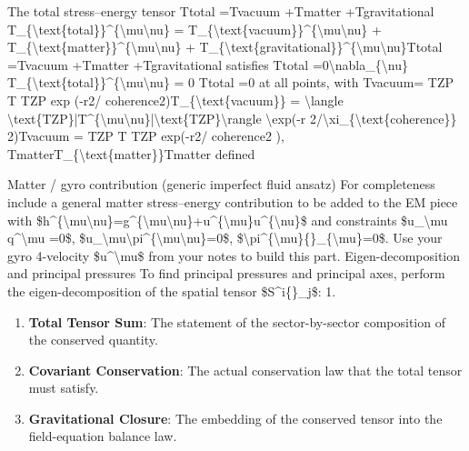The total stress--energy tensor Ttotal  =Tvacuum  +Tmatter  +Tgravitational  T\_\{\textbackslash{}text\{total\}\}\textasciicircum{}\{\textbackslash{}mu\textbackslash{}nu\} = T\_\{\textbackslash{}text\{vacuum\}\}\textasciicircum{}\{\textbackslash{}mu\textbackslash{}nu\} + T\_\{\textbackslash{}text\{matter\}\}\textasciicircum{}\{\textbackslash{}mu\textbackslash{}nu\} + T\_\{\textbackslash{}text\{gravitational\}\}\textasciicircum{}\{\textbackslash{}mu\textbackslash{}nu\}Ttotal   =Tvacuum   +Tmatter   +Tgravitational   satisfies   Ttotal  =0\textbackslash{}nabla\_\{\textbackslash{}nu\} T\_\{\textbackslash{}text\{total\}\}\textasciicircum{}\{\textbackslash{}mu\textbackslash{}nu\} = 0   Ttotal   =0 at all points, with Tvacuum= TZP T   TZP exp (-r2/ coherence2)T\_\{\textbackslash{}text\{vacuum\}\} = \textbackslash{}langle \textbackslash{}text\{TZP\}|T\textasciicircum{}\{\textbackslash{}mu\textbackslash{}nu\}|\textbackslash{}text\{TZP\}\textbackslash{}rangle \textbackslash{}exp(-r 2/\textbackslash{}xi\_\{\textbackslash{}text\{coherence\}\} 2)Tvacuum = TZP T   TZP exp(-r2/ coherence2 ), TmatterT\_\{\textbackslash{}text\{matter\}\}Tmatter defined

Matter / gyro contribution (generic imperfect fluid ansatz) For completeness include a general matter stress--energy contribution to be added to the EM piece with \$h\textasciicircum{}\{\textbackslash{}mu\textbackslash{}nu\}=g\textasciicircum{}\{\textbackslash{}mu\textbackslash{}nu\}+u\textasciicircum{}\{\textbackslash{}mu\}u\textasciicircum{}\{\textbackslash{}nu\}\$ and constraints \$u\_\textbackslash{}mu q\textasciicircum{}\textbackslash{}mu =0\$, \$u\_\textbackslash{}mu\textbackslash{}pi\textasciicircum{}\{\textbackslash{}mu\textbackslash{}nu\}=0\$, \$\textbackslash{}pi\textasciicircum{}\{\textbackslash{}mu\}\{\}\_\{\textbackslash{}mu\}=0\$. Use your gyro 4-velocity \$u\textasciicircum{}\textbackslash{}mu\$ from your notes to build this part. Eigen-decomposition and principal pressures To find principal pressures and principal axes, perform the eigen-decomposition of the spatial tensor \$S\textasciicircum{}i\{\}\_j\$: 1.
\endgroup

\begin{enumerate}[leftmargin=1.6em,itemsep=6pt,topsep=4pt]
\item \textbf{Total Tensor Sum}: The statement of the sector-by-sector composition of the conserved quantity.
\item \textbf{Covariant Conservation}: The actual conservation law that the total tensor must satisfy.
\item \textbf{Gravitational Closure}: The embedding of the conserved tensor into the field-equation balance law.
\end{enumerate}

